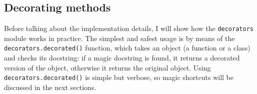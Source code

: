 \documentclass[11pt,english]{article}
\begin{document}
\hypertarget{decorating-methods}{}
\subsection*{Decorating methods}

Before talking about the implementation details, I will show
how the \texttt{decorators} module works in practice. The simplest and safest
usage is by means of the \texttt{decorators.decorated()} function, which
takes an object (a function or a class) and checks its docstring: if 
a magic docstring is found, it returns a decorated version of the object, 
otherwise it returns the original object. Using \texttt{decorators.decorated()}
is simple but verbose, so magic shortcuts will be discussed in the next 
sections.
\end{document}
